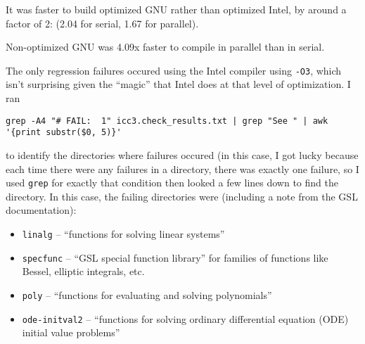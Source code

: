 \documentclass{article}
\begin{document}
It was faster to build optimized GNU rather than optimized Intel, by around a factor of 2: (2.04 for serial, 1.67 for parallel).

Non-optimized GNU was 4.09x faster to compile in parallel than in serial.

The only regression failures occured using the Intel compiler using \texttt{-O3}, which isn't surprising given
the ``magic'' that Intel does at that level of optimization. 
I ran
\begin{verbatim}
grep -A4 "# FAIL:  1" icc3.check_results.txt | grep "See " | awk '{print substr($0, 5)}'
\end{verbatim}
to identify the directories where failures occured (in this case, I got lucky because each time there were any failures in
a directory, there was exactly one failure, so I used \texttt{grep} for exactly that condition then looked a few lines down to find the directory. In this case, the failing directories were (including a note from the GSL documentation):
\begin{itemize}
\item \texttt{linalg} -- ``functions for solving linear systems''
\item \texttt{specfunc} -- ``GSL special function library'' for families of functions like Bessel, elliptic integrals, etc.
\item \texttt{poly} -- ``functions for evaluating and solving polynomials''
\item \texttt{ode-initval2} -- ``functions for solving ordinary differential equation (ODE) initial value problems''
\end{itemize}


%
%
\end{document}
